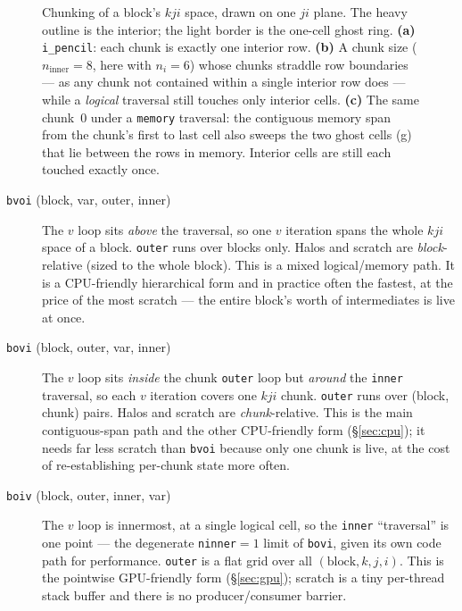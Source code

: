 \documentclass[11pt]{article}
\newcommand{\code}[1]{\lstinline[basicstyle=\ttfamily]|#1|}
\newcommand{\codelbl}[1]{\texttt{#1}}
\begin{document}
\begin{figure}[t]
\centering

\caption{Chunking of a block's $kji$ space, drawn on one $ji$ plane. The heavy
outline is the interior; the light border is the one-cell ghost ring.
\textbf{(a)} \code{i_pencil}: each chunk is exactly one interior row.
\textbf{(b)} A chunk size ($n_{\mathrm{inner}}=8$, here with $n_i=6$) whose chunks
straddle row boundaries --- as any chunk not contained within a single interior
row does --- while a \emph{logical} traversal still touches only interior cells. \textbf{(c)} The same chunk~0 under a
\code{memory} traversal: the contiguous memory span from the chunk's first to last
cell also sweeps the two ghost cells (\textcolor{red!75!black}{g}) that lie between
the rows in memory. Interior cells are still each touched exactly once.}
\label{fig:chunk}
\end{figure}

\begin{description}
\item[\codelbl{bvoi} (block, var, outer, inner)] The $v$ loop sits \emph{above} the
  traversal, so one $v$ iteration spans the whole $kji$ space of a block.
  \code{outer} runs over blocks only. Halos and scratch are \emph{block}-relative
  (sized to the whole block). This is a mixed logical/memory path. It is a
  CPU-friendly hierarchical form and in practice often the fastest, at the price
  of the most scratch --- the entire block's worth of intermediates is live at
  once.
\item[\codelbl{bovi} (block, outer, var, inner)] The $v$ loop sits \emph{inside} the
  chunk \code{outer} loop but \emph{around} the \code{inner} traversal, so each
  $v$ iteration covers one $kji$ chunk. \code{outer} runs over (block, chunk)
  pairs. Halos and scratch are \emph{chunk}-relative. This is the main
  contiguous-span path and the other CPU-friendly form (\S\ref{sec:cpu}); it needs
  far less scratch than \code{bvoi} because only one chunk is live, at the cost of
  re-establishing per-chunk state more often.
\item[\codelbl{boiv} (block, outer, inner, var)] The $v$ loop is innermost, at a
  single logical cell, so the \code{inner} ``traversal'' is one point --- the
  degenerate \code{ninner}${=}1$ limit of \code{bovi}, given its own code path for
  performance. \code{outer} is a flat grid over all $(\text{block}, k, j, i)$.
  This is the pointwise GPU-friendly form (\S\ref{sec:gpu}); scratch is a tiny
  per-thread stack buffer and there is no producer/consumer barrier.
\end{description}
\end{document}
